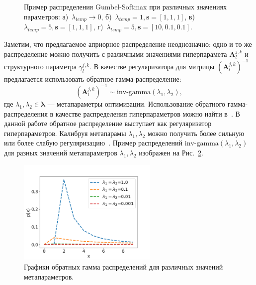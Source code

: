 \begin{figure}
\begin{minipage}[t]{.2\textwidth}
\subcaption{}
\end{minipage}

\caption{Пример распределения Gumbel-Softmax при различных значениях параметров: а)~$\lambda_{temp}\to0$, б)~$\lambda_{temp}=1, \mathbf{s}=[1,1,1]$, в)~$\lambda_{temp}=5, \mathbf{s}=[1,1,1]$, г)~$\lambda_{temp}=5, \mathbf{s}=[10,0.1,0.1].$}
\label{fig:gs}

\end{figure}


Заметим, что предлагаемое априорное распределение неоднозначно: одно и то же распределение  можно получить с различными значениями гиперпарамета $\mathbf{A}^{j,k}_l$ и структурного параметра $\gamma^{j,k}_l$. В качестве регуляризатора для матрицы $(\mathbf{A}^{j,k}_l)^{-1}$ предлагается использовать обратное гамма-распределение:
\[
    (\mathbf{A}^{j,k}_l)^{-1} \sim \text{inv-gamma}(\lambda_1,\lambda_2),
\]
где $\lambda_1,\lambda_2 \in \boldsymbol{\lambda}$ --- метапараметры оптимизации. 
Использование обратного гамма-распределения в качестве распределения гиперпараметров можно найти в~\cite{bishop,mackay}. В данной работе обратное распределение выступает как регуляризатор гиперпараметров.
Калибруя метапарамы   $\lambda_1,\lambda_2$ можно получить более сильную или более слабую регуляризацию~\cite{rvm}. Пример распределений $\text{inv-gamma}(\lambda_1,\lambda_2)$ для разных значений метапараметров $\lambda_1,\lambda_2$ изображен на Рис.~\ref{fig:inv-gamma}.

\begin{figure}
\centering
\includegraphics[width=0.6\textwidth]{plots/notebooks/invgamma.png}
\caption{Графики обратных гамма распределений для различных значений метапараметров.}
\label{fig:inv-gamma}
\end{figure}


